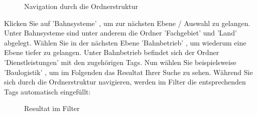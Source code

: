 \begin{figure}[H]
\caption{Navigation durch die Ordnerstruktur}
\end{figure}

Klicken Sie auf 'Bahnsysteme' , um zur nächsten Ebene / Auswahl zu gelangen. Unter Bahnsysteme sind unter anderem die Ordner 'Fachgebiet' und 'Land' abgelegt. Wählen Sie in der nächsten Ebene 'Bahnbetrieb' , um wiederum eine Ebene tiefer zu gelangen. Unter Bahnbetrieb befindet sich der Ordner 'Dienstleistungen' mit den zugehörigen Tags. Nun wählen Sie beispielsweise 'Baulogistik' , um im Folgenden das Resultat Ihrer Suche zu sehen. Während Sie sich durch die Ordnerstruktur navigieren, werden im Filter die entsprechenden Tags automatisch eingefüllt:

\begin{figure}[H]
\caption{Resultat im Filter}
\end{figure}

